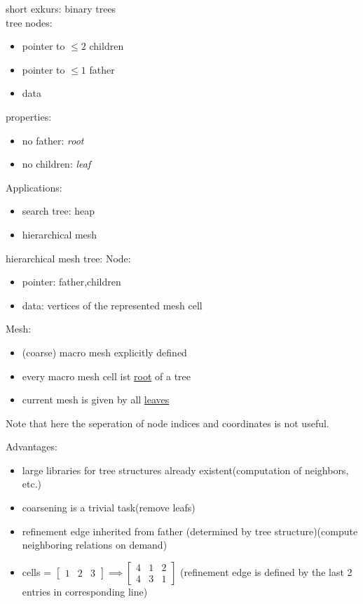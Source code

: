 short exkurs: binary trees\\
tree nodes:
\begin{itemize}
	\item pointer to $\leq 2$ children
	\item pointer to $\leq 1$ father
	\item data
	
\end{itemize}
properties:
\begin{itemize}
	\item no father: \textit{root}
	\item no children: \textit{leaf}
\end{itemize}

Applications:
\begin{itemize}
	\item search tree: heap
	\item hierarchical mesh
\end{itemize}

hierarchical mesh tree:
Node:
\begin{itemize}
	\item pointer: father,children
	\item data: vertices of the represented mesh cell
\end{itemize}

Mesh:
\begin{itemize}
	\item (coarse) macro mesh explicitly defined
	\item every macro mesh cell ist \underline{root} of a tree
	\item current mesh is given by all \underline{leaves}
	
\end{itemize}

Note that here the seperation of node indices and coordinates is not useful.\vspace{1cm}

Advantages:
\begin{itemize}
	\item large libraries for tree structures already existent(computation of neighbors, etc.)
	\item coarsening is a trivial task(remove leafs)
	\item refinement edge inherited from father (determined by tree structure)(compute neighboring relations \glqq on demand\grqq)
	
	\item cells = 
	$\begin{bmatrix}
	1 & 2 & 3
	\end{bmatrix} \implies 
	\begin{bmatrix}
	4 & 1 & 2\\
	4 & 3 & 1
	\end{bmatrix} $ (refinement edge is defined by the last 2 entries in corresponding line)
\end{itemize}

